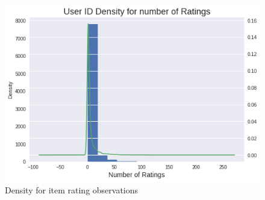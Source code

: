 \documentclass[letterpaper, 10 pt, conference]{ieeeconf}  %
\begin{document}
\begin{enumerate}
\begin{itemize}
        \begin{figure}[h]
            \includegraphics[scale=0.4]{userid-rating-frec.png}
            \centering
            \caption{Density for item rating observations}
            \label{fig:userid-rating-frec}
        \end{figure}
        
        
        

\end{itemize}
\end{enumerate}
\end{document}

